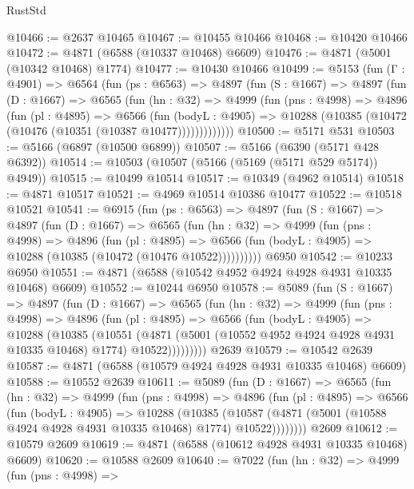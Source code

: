 \begin{lexlean}{RustStd}
\begin{coremodule}
@10466 := @2637 @10465
@10467 := @10455 @10466
@10468 := @10420 @10466
@10472 := @4871 (@6588 (@10337 @10468) @6609)
@10476 := @4871 (@5001 (@10342 @10468) @1774)
@10477 := @10430 @10466
@10499 := @5153
    (fun (Γ : @4901) =>
    @6564
      (fun (ps : @6563) =>
      @4897
        (fun (S : @1667) =>
        @4897
          (fun (D : @1667) =>
          @6565
            (fun (hn : @32) =>
            @4999
              (fun (pns : @4998) =>
              @4896
                (fun (pl : @4895) =>
                @6566
                  (fun (bodyL : @4905) =>
                  @10288 (@10385 (@10472 (@10476 (@10351 (@10387 @10477)))))))))))))
@10500 := @5171 @531
@10503 := @5166 (@6897 (@10500 @6899))
@10507 := @5166 (@6390 (@5171 @428 @6392))
@10514 := @10503 (@10507 (@5166 (@5169 (@5171 @529 @5174)) @4949))
@10515 := @10499 @10514
@10517 := @10349 (@4962 @10514)
@10518 := @4871 @10517
@10521 := @4969 @10514 @10386 @10477
@10522 := @10518 @10521
@10541 := @6915
    (fun (ps : @6563) =>
    @4897
      (fun (S : @1667) =>
      @4897
        (fun (D : @1667) =>
        @6565
          (fun (hn : @32) =>
          @4999
            (fun (pns : @4998) =>
            @4896
              (fun (pl : @4895) =>
              @6566 (fun (bodyL : @4905) => @10288 (@10385 (@10472 (@10476 @10522))))))))))
    @6950
@10542 := @10233 @6950
@10551 := @4871 (@6588 (@10542 @4952 @4924 @4928 @4931 @10335 @10468) @6609)
@10552 := @10244 @6950
@10578 := @5089
    (fun (S : @1667) =>
    @4897
      (fun (D : @1667) =>
      @6565
        (fun (hn : @32) =>
        @4999
          (fun (pns : @4998) =>
          @4896
            (fun (pl : @4895) =>
            @6566
              (fun (bodyL : @4905) =>
              @10288
                (@10385
                  (@10551
                    (@4871
                      (@5001 (@10552 @4952 @4924 @4928 @4931 @10335 @10468) @1774)
                      @10522)))))))))
    @2639
@10579 := @10542 @2639
@10587 := @4871 (@6588 (@10579 @4924 @4928 @4931 @10335 @10468) @6609)
@10588 := @10552 @2639
@10611 := @5089
    (fun (D : @1667) =>
    @6565
      (fun (hn : @32) =>
      @4999
        (fun (pns : @4998) =>
        @4896
          (fun (pl : @4895) =>
          @6566
            (fun (bodyL : @4905) =>
            @10288
              (@10385
                (@10587 (@4871 (@5001 (@10588 @4924 @4928 @4931 @10335 @10468) @1774) @10522))))))))
    @2609
@10612 := @10579 @2609
@10619 := @4871 (@6588 (@10612 @4928 @4931 @10335 @10468) @6609)
@10620 := @10588 @2609
@10640 := @7022
    (fun (hn : @32) =>
    @4999
      (fun (pns : @4998) =>

\end{coremodule}
\end{lexlean}
